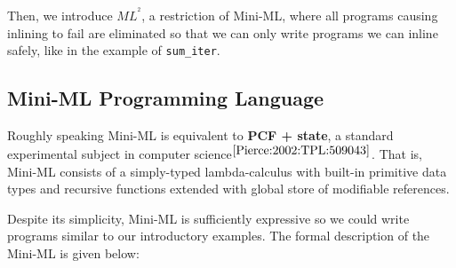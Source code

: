 \documentclass[a4paper,11pt,oneside]{article}
\theoremstyle{plain}
\newcommand{\inlsrc}{\textit{ML}^{^2}}
\begin{document}
	Then, we introduce ${\inlsrc}$, a restriction of Mini-ML, where all programs causing inlining to fail are eliminated so that we can only write programs we can inline safely, like in the example of \texttt{sum\_iter}. 
	
\subsection{Mini-ML Programming Language}

	Roughly speaking Mini-ML is equivalent to \textbf{PCF + state}, a standard experimental subject in computer science{\footnotesize$^{ \cite[p.~143]{Pierce:2002:TPL:509043}}$}. 
	That is, Mini-ML consists of a simply-typed lambda-calculus with built-in primitive data types and recursive functions extended with global store of modifiable references.
	
	Despite its simplicity, Mini-ML is sufficiently expressive so we  
could write programs similar to our introductory examples.
	The formal description of the Mini-ML is given below: 
	
\end{document}
